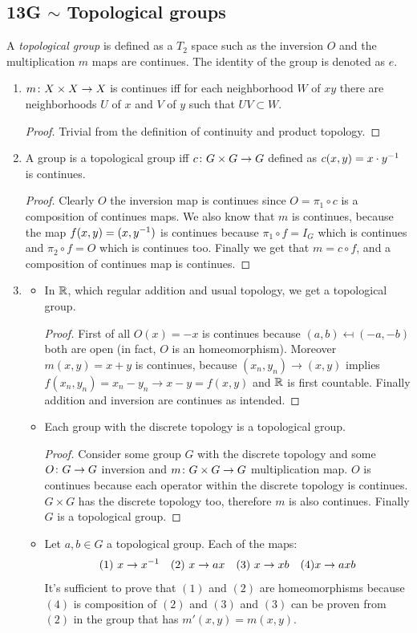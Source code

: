 \documentclass[a4paper]{article}
\newcommand\nsubsection[1]{\subsection*{#1}\addcontentsline{toc}{subsection}{#1}}
\begin{document}
	\nsubsection{13G $\sim$ Topological groups}
	A \textit{topological group} is defined as a $T_2$ space such as the inversion $O$ and the multiplication $m$ maps are continues. The identity of the group is denoted as $e$. 
	\begin{enumerate}
		\item $m \colon X\times X \to X$ is continues iff for each neighborhood $W$ of $xy$ there are neighborhoods $U$ of $x$ and $V$ of $y$ such that $UV \subset W$. \begin{proof}
			Trivial from the definition of continuity and product topology. 
		\end{proof}
		\item A group is a topological group iff $c \colon G \times G \to G$ defined as $c(x, y) = x \cdot y^{-1}$ is continues. \begin{proof}
			Clearly $O$ the inversion map is continues since $O = \pi_1\circ c$ is a composition of continues maps. 
			We also know that $m$ is continues, because the map $f(x, y) = (x, y^{-1})$ is continues because $\pi_1 \circ f = I_G$ which is continues and $\pi_2 \circ f = O$ which is continues too. Finally we get that $m = c \circ f$, and a composition of continues map is continues. 
		\end{proof}
		\item \begin{itemize}
			\item In $\mathbb{R}$, which regular addition and usual topology, we get a topological group. \begin{proof}
				First of all $O(x) = -x$ is continues because $(a, b) \mapsfrom (-a, -b)$ both are open (in fact, $O$ is an homeomorphism). Moreover $m(x, y) = x + y$ is continues, because $(x_n, y_n) \to (x, y)$ implies $f(x_n, y_n) = x_n - y_n \to x - y = f(x, y)$ and $\mathbb{R}$ is first countable. Finally addition and inversion are continues as intended. 
			\end{proof}
			\item Each group with the discrete topology is a topological group. \begin{proof}
				Consider some group $G$ with the discrete topology and some $O \colon G \to G$ inversion and $m \colon G \times G \to G$ multiplication map. $O$ is continues because each operator within the discrete topology is continues. $G \times G$ has the discrete topology too, therefore $m$ is also continues. Finally $G$ is a topological group. 
			\end{proof}
			\item Let $a, b \in G$ a topological group. Each of the maps: 
			\begin{align*}
				(1) \ x \to x^{-1} && (2) \ x \to ax && (3) \ x \to xb && (4) x \to axb
			\end{align*}
			It's sufficient to prove that $(1)$ and $(2)$ are homeomorphisms because $(4)$ is composition of $(2)$ and $(3)$ and $(3)$ can be proven from $(2)$ in the group that has $m'(x, y) = m(x, y)$. 
			

\end{itemize}
\end{enumerate}
\end{document}
